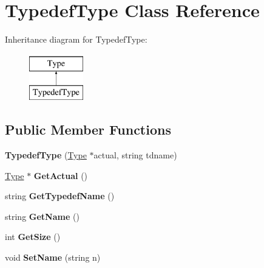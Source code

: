 \hypertarget{classTypedefType}{\section{Typedef\-Type Class Reference}
\label{classTypedefType}
}
Inheritance diagram for Typedef\-Type\-:\begin{figure}[H]
\begin{center}
\leavevmode
\includegraphics[height=2.000000cm]{classTypedefType}
\end{center}
\end{figure}
\subsection*{Public Member Functions}
\begin{DoxyCompactItemize}
\item 
\hypertarget{classTypedefType_ab522e8d31ef5c3d930d34019d96322d3}{{\bfseries Typedef\-Type} (\hyperlink{classType}{Type} $\ast$actual, string tdname)}\label{classTypedefType_ab522e8d31ef5c3d930d34019d96322d3}

\item 
\hypertarget{classTypedefType_aed916f03580c43bb8b7194cb977be1ca}{\hyperlink{classType}{Type} $\ast$ {\bfseries Get\-Actual} ()}\label{classTypedefType_aed916f03580c43bb8b7194cb977be1ca}

\item 
\hypertarget{classTypedefType_a1250c26bbd42721efcbc707c25ae50e3}{string {\bfseries Get\-Typedef\-Name} ()}\label{classTypedefType_a1250c26bbd42721efcbc707c25ae50e3}

\item 
\hypertarget{classType_a8143fe4686ae1a5709a5955396c6ee26}{string {\bfseries Get\-Name} ()}\label{classType_a8143fe4686ae1a5709a5955396c6ee26}

\item 
\hypertarget{classType_afe0fca035825759785b525d2a24f69fe}{int {\bfseries Get\-Size} ()}\label{classType_afe0fca035825759785b525d2a24f69fe}

\item 
\hypertarget{classType_ab8d2328a3a76289edf42b9bf0d4f278f}{void {\bfseries Set\-Name} (string n)}\label{classType_ab8d2328a3a76289edf42b9bf0d4f278f}

\end{DoxyCompactItemize}
